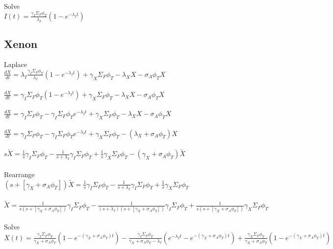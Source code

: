 \documentclass[11pt,a4paper]{article}
\begin{document}
\noindent Solve \\
$I(t)=\frac{\gamma_I\Sigma_F\phi_T}{\lambda_I}(1-e^{-\lambda_I t})$

\subsection{Xenon}
Laplace \\
$\frac{dX}{dt}=\lambda_I \frac{\gamma_I\Sigma_F\phi_T}{\lambda_I}(1-e^{-\lambda_I t}) + \gamma_X \Sigma_F \phi_T - \lambda_X X - \sigma_A \phi_T X$ \\ \\
$\frac{dX}{dt}=\gamma_I\Sigma_F\phi_T(1-e^{-\lambda_I t}) + \gamma_X \Sigma_F \phi_T - \lambda_X X - \sigma_A \phi_T X$ \\ \\
$\frac{dX}{dt}=\gamma_I\Sigma_F\phi_T - \gamma_I\Sigma_F\phi_T e^{-\lambda_I t} + \gamma_X \Sigma_F \phi_T - \lambda_X X - \sigma_A \phi_T X$ \\ \\
$\frac{dX}{dt}=\gamma_I\Sigma_F\phi_T - \gamma_I\Sigma_F\phi_T e^{-\lambda_I t} + \gamma_X \Sigma_F \phi_T - (\lambda_X + \sigma_A \phi_T) X$ \\ \\
$s\tilde{X}=\frac{1}{s}\gamma_I\Sigma_F\phi_T - \frac{1}{s+\lambda_I}\gamma_I\Sigma_F\phi_T + \frac{1}{s}\gamma_X\Sigma_F\phi_T - (\gamma_X+\sigma_A\phi_T)\tilde{X}$ \\ \\

\noindent Rearrange \\
$(s+[\gamma_X+\sigma_A\phi_T])\tilde{X}=\frac{1}{s}\gamma_I\Sigma_F\phi_T - \frac{1}{s+\lambda_I}\gamma_I\Sigma_F\phi_T + \frac{1}{s}\gamma_X\Sigma_F\phi_T$ \\ \\
$\tilde{X}=\frac{1}{s(s+[\gamma_X+\sigma_A\phi_T])}\gamma_I\Sigma_F\phi_T - \frac{1}{(s+\lambda_I)(s+[\gamma_X+\sigma_A\phi_T])}\gamma_I\Sigma_F\phi_T + \frac{1}{s(s+[\gamma_X+\sigma_A\phi_T])}\gamma_X\Sigma_F\phi_T$ \\ \\

\noindent Solve \\
$X(t)=\frac{\gamma_I\Sigma_F\phi_T}{\gamma_X+\sigma_A\phi_T}(1-e^{-(\gamma_X+\sigma_A\phi_T)t})-\frac{\gamma_I\Sigma_F\phi_T}{\gamma_X+\sigma_A\phi_T-\lambda_I}(e^{-\lambda_I t}-e^{-(\gamma_X+\sigma_A\phi_T)t})+\frac{\gamma_X\Sigma_F\phi_T}{\gamma_X+\sigma_A\phi_T}(1-e^{-(\gamma_X+\sigma_A\phi_T)t})$ \\
\end{document}
